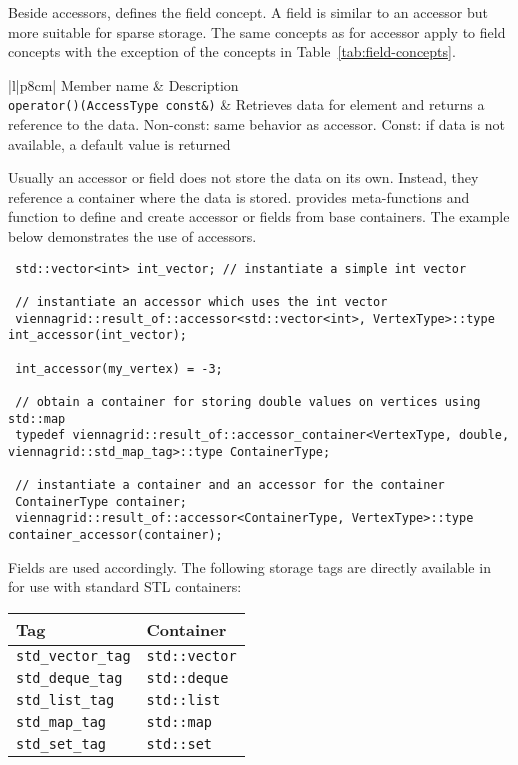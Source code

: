 Beside accessors, {\ViennaGrid} defines the field concept.
A field is similar to an accessor but more suitable for sparse storage.
The same concepts as for accessor apply to field concepts with the exception of the concepts in Table~\ref{tab:field-concepts}.

 \begin{table}[tbp]
 \begin{center}
  \begin{tabular}{|l|p{8cm}|}
   \hline
   Member name & Description \\
   \hline
   \lstinline|operator()(AccessType const&)| & Retrieves data for element and returns a reference to the data. Non-const: same behavior as accessor. Const: if data is not available, a default value is returned \\
   \hline
  \end{tabular}
 \end{center}
 \caption{Field concept. Same as the accessor concept except for the const-access case.}
 \label{tab:field-concepts}
 \end{table}

Usually an accessor or field does not store the data on its own.
Instead, they reference a container where the data is stored.
{\ViennaGrid} provides meta-functions and function to define and create accessor or fields from base containers.
The example below demonstrates the use of {\ViennaGrid} accessors.
 \begin{lstlisting}
 std::vector<int> int_vector; // instantiate a simple int vector

 // instantiate an accessor which uses the int vector
 viennagrid::result_of::accessor<std::vector<int>, VertexType>::type int_accessor(int_vector);

 int_accessor(my_vertex) = -3;

 // obtain a container for storing double values on vertices using std::map
 typedef viennagrid::result_of::accessor_container<VertexType, double, viennagrid::std_map_tag>::type ContainerType;

 // instantiate a container and an accessor for the container
 ContainerType container;
 viennagrid::result_of::accessor<ContainerType, VertexType>::type container_accessor(container);
\end{lstlisting}
Fields are used accordingly. The following storage tags are directly available in {\ViennaGridminorversion} for use with standard STL containers:
\begin{center}
\begin{tabular}{|l|l|}
 \hline
 Tag              & Container \\
 \hline
 \lstinline|std_vector_tag|   &  \lstinline|std::vector| \\
 \lstinline|std_deque_tag|    &  \lstinline|std::deque|  \\
 \lstinline|std_list_tag|     &  \lstinline|std::list|   \\
 \lstinline|std_map_tag|      &  \lstinline|std::map|    \\
 \lstinline|std_set_tag|      &  \lstinline|std::set|    \\
 \hline
\end{tabular}
\end{center}
